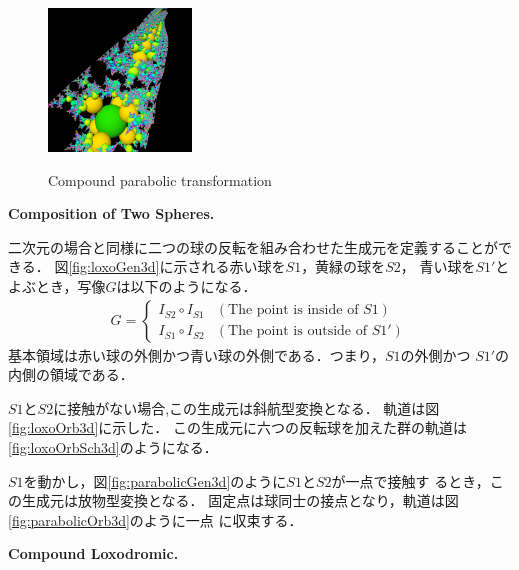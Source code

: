 \begin{figure}[h!tbp]
\begin{minipage}{0.49\hsize}
  \begin{minipage}{0.24\hsize}
   \center
   \includegraphics[width=1.5in, height=1.5in, keepaspectratio]{../img/klein/3diis/compParabolicOrb.pdf}
   \label{fig:compParabolicOrb}
  \end{minipage}
  \hspace*{\fill}
  \caption{Compound parabolic transformation}
  \label{fig:compParabolic}
 \end{minipage}
\end{figure}

\noindent\textbf{Composition of Two Spheres.}

二次元の場合と同様に二つの球の反転を組み合わせた生成元を定義することができる．
図\ref{fig:loxoGen3d}に示される赤い球を$S1$，黄緑の球を$S2$，
青い球を$S1'$とよぶとき，写像$G$は以下のようになる．
\begin{align*}
G =
\begin{cases}
 I_{S2} \circ I_{S1} & (\text{The point is inside of } S1) \\
 I_{S1} \circ I_{S2} & (\text{The point is outside of }S1')
\end{cases}
\end{align*}
基本領域は赤い球の外側かつ青い球の外側である．つまり，$S1$の外側かつ
$S1'$の内側の領域である．

$S1$と$S2$に接触がない場合,この生成元は斜航型変換となる．
軌道は図\ref{fig:loxoOrb3d}に示した．
この生成元に六つの反転球を加えた群の軌道は\ref{fig:loxoOrbSch3d}のようになる．

$S1$を動かし，図\ref{fig:parabolicGen3d}のように$S1$と$S2$が一点で接触す
るとき，この生成元は放物型変換となる．
固定点は球同士の接点となり，軌道は図\ref{fig:parabolicOrb3d}のように一点
に収束する．

\noindent\textbf{Compound Loxodromic.}

